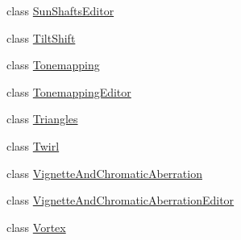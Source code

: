 \begin{DoxyCompactItemize}
\item 
class \mbox{\hyperlink{class_unity_standard_assets_1_1_image_effects_1_1_sun_shafts_editor}{Sun\+Shafts\+Editor}}
\item 
class \mbox{\hyperlink{class_unity_standard_assets_1_1_image_effects_1_1_tilt_shift}{Tilt\+Shift}}
\item 
class \mbox{\hyperlink{class_unity_standard_assets_1_1_image_effects_1_1_tonemapping}{Tonemapping}}
\item 
class \mbox{\hyperlink{class_unity_standard_assets_1_1_image_effects_1_1_tonemapping_editor}{Tonemapping\+Editor}}
\item 
class \mbox{\hyperlink{class_unity_standard_assets_1_1_image_effects_1_1_triangles}{Triangles}}
\item 
class \mbox{\hyperlink{class_unity_standard_assets_1_1_image_effects_1_1_twirl}{Twirl}}
\item 
class \mbox{\hyperlink{class_unity_standard_assets_1_1_image_effects_1_1_vignette_and_chromatic_aberration}{Vignette\+And\+Chromatic\+Aberration}}
\item 
class \mbox{\hyperlink{class_unity_standard_assets_1_1_image_effects_1_1_vignette_and_chromatic_aberration_editor}{Vignette\+And\+Chromatic\+Aberration\+Editor}}
\item 
class \mbox{\hyperlink{class_unity_standard_assets_1_1_image_effects_1_1_vortex}{Vortex}}
\end{DoxyCompactItemize}

